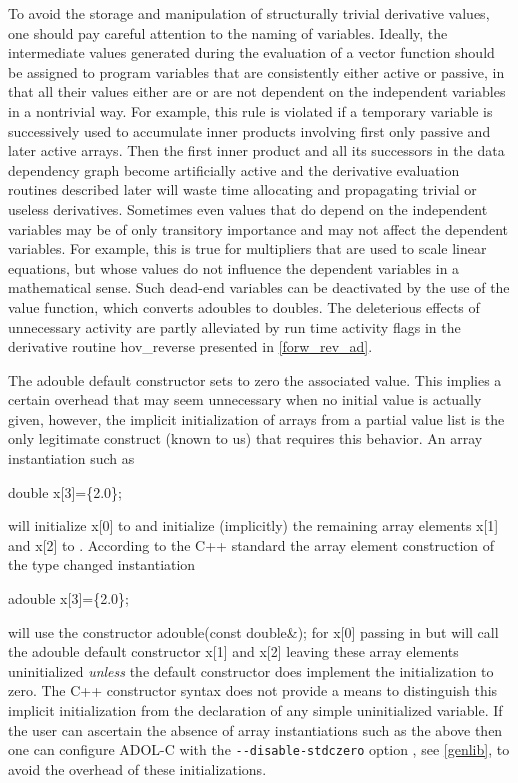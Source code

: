 \documentclass[11pt,twoside]{article}
\begin{document}
To avoid the storage and manipulation of structurally
trivial derivative values, one should pay careful attention to
the naming of variables. Ideally, the intermediate
values generated during the evaluation of a vector function
should be assigned to program variables that are
consistently either active or passive, in that all their values
either are or are not dependent on the independent variables
in a nontrivial way. For example, this rule is violated if a temporary
variable is successively used to accumulate inner products involving
first only passive and later active arrays. Then the first inner
product and all its successors in the data dependency graph become
artificially active and the derivative evaluation routines
described later will waste
time allocating and propagating
trivial or useless derivatives. Sometimes even values that do
depend on the independent variables may be of only transitory
importance and may not affect the dependent variables. For example,
this is true for multipliers that are used to scale linear
equations, but whose values do not influence the dependent
variables in a mathematical sense. Such dead-end variables
can be deactivated by the use of the {\sf value} function, which
converts {\sf adouble}s to {\sf double}s. The deleterious effects
of unnecessary activity are partly alleviated by run time
activity flags in the derivative routine
{\sf hov\_reverse} presented in \autoref{forw_rev_ad}.

The {\sf adouble} default constructor sets to zero the associated value. 
This implies a certain overhead that may seem unnecessary when no initial value 
is actually given, however, 
the implicit initialization of arrays from a partial value list is the only legitimate construct (known to us) that requires this behavior.
An array instantiation such as 
\begin{center}
\sf double x[3]=\{2.0\};
\end{center}
will initialize {\sf x[0]} to {} and initialize (implicitly) the remaining array elements 
{\sf x[1]} and {\sf x[2]}  to {}. According to the C++ standard the array element  construction of 
the type changed instantiation 
\begin{center}
\sf adouble x[3]=\{2.0\};
\end{center}
will use the constructor {\sf adouble(const double\&);} for {\sf x[0]} passing in {} but 
will call the {\sf adouble} default constructor {\sf x[1]} and {\sf x[2]} leaving these array 
elements uninitialized {\em unless} the default constructor does implement the initialization to 
zero. 
The C++ constructor syntax does not provide a means to  distinguish this implicit initialization from the declaration of any simple uninitialized variable.
If the user can ascertain the absence of array instantiations such as the above then one can  
configure ADOL-C with the \verb=--disable-stdczero= option , see \autoref{genlib}, to 
avoid the overhead of these initializations.  
 
\end{document}
